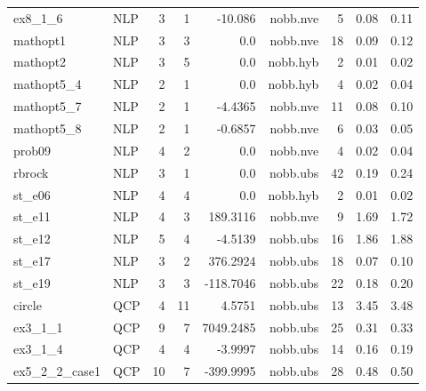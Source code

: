 \documentclass[a4paper,landscape]{article}
\begin{document}
\begin{center}
\begin{tabular}{|l|l|r|r|r|r|r|r|r|}
ex8\_1\_6 & NLP & 3 & 1 & -10.086 & nobb.nve & 5 & 0.08 & 0.11 \\
mathopt1 & NLP & 3 & 3 & 0.0 & nobb.nve & 18 & 0.09 & 0.12 \\
mathopt2 & NLP & 3 & 5 & 0.0 & nobb.hyb & 2 & 0.01 & 0.02 \\
mathopt5\_4 & NLP & 2 & 1 & 0.0 & nobb.hyb & 4 & 0.02 & 0.04 \\
mathopt5\_7 & NLP & 2 & 1 & -4.4365 & nobb.nve & 11 & 0.08 & 0.10 \\
mathopt5\_8 & NLP & 2 & 1 & -0.6857 & nobb.nve & 6 & 0.03 & 0.05 \\
prob09 & NLP & 4 & 2 & 0.0 & nobb.nve & 4 & 0.02 & 0.04 \\
rbrock & NLP & 3 & 1 & 0.0 & nobb.ubs & 42 & 0.19 & 0.24 \\
st\_e06 & NLP & 4 & 4 & 0.0 & nobb.hyb & 2 & 0.01 & 0.02 \\
st\_e11 & NLP & 4 & 3 & 189.3116 & nobb.nve & 9 & 1.69 & 1.72 \\
st\_e12 & NLP & 5 & 4 & -4.5139 & nobb.ubs & 16 & 1.86 & 1.88 \\
st\_e17 & NLP & 3 & 2 & 376.2924 & nobb.ubs & 18 & 0.07 & 0.10 \\
st\_e19 & NLP & 3 & 3 & -118.7046 & nobb.ubs & 22 & 0.18 & 0.20 \\
circle & QCP & 4 & 11 & 4.5751 & nobb.ubs & 13 & 3.45 & 3.48 \\
ex3\_1\_1 & QCP & 9 & 7 & 7049.2485 & nobb.ubs & 25 & 0.31 & 0.33 \\
ex3\_1\_4 & QCP & 4 & 4 & -3.9997 & nobb.ubs & 14 & 0.16 & 0.19 \\
ex5\_2\_2\_case1 & QCP & 10 & 7 & -399.9995 & nobb.ubs & 28 & 0.48 & 0.50 \\
\hline  \end{tabular}
\end{center}
\newpage
\end{document}
